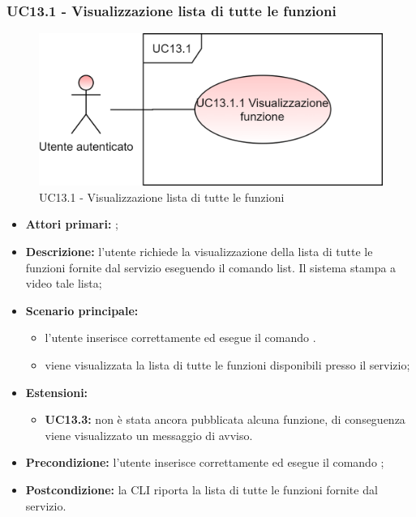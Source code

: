 \subsubsection{UC13.1 -  Visualizzazione lista di tutte le funzioni}
\begin{figure}[H]
	\centering
	\includegraphics[scale=\ucs]{./res/img/UC13-1.png}
	\caption {UC13.1 -  Visualizzazione lista di tutte le funzioni}
\end{figure}
\begin{itemize}
	\item \textbf{Attori primari:} \ua{};
	\item \textbf{Descrizione:} l’utente richiede la visualizzazione della lista di tutte le funzioni fornite dal servizio eseguendo il comando list. Il sistema stampa a video tale lista; 
	\item \textbf{Scenario principale:} 
	\begin{itemize}
		\item l'utente inserisce correttamente ed esegue il comando \lista{}. 
		\item viene visualizzata la lista di tutte le funzioni disponibili presso il servizio;
	\end{itemize}
	\item \textbf{Estensioni:} 
	\begin{itemize}
		\item \textbf{UC13.3:} non è stata ancora pubblicata alcuna funzione, di conseguenza viene visualizzato un messaggio di avviso. 
	\end{itemize}
	\item \textbf{Precondizione:} l'utente inserisce correttamente ed esegue il comando \lista{};
	\item \textbf{Postcondizione:} la CLI riporta la lista di tutte le funzioni fornite dal servizio.
\end{itemize}